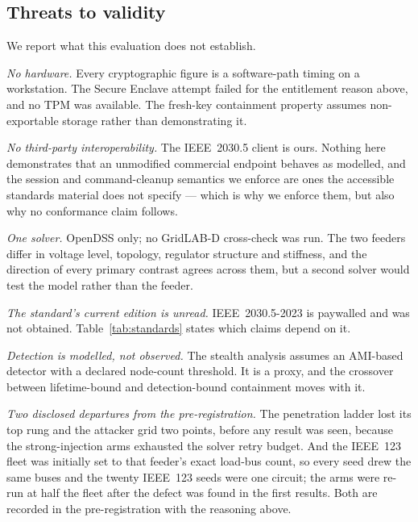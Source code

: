 \subsection{Threats to validity}\label{sec:limits}
We report what this evaluation does not establish.

\emph{No hardware.} Every cryptographic figure is a software-path timing on a workstation. The
Secure Enclave attempt failed for the entitlement reason above, and no TPM was available. The
fresh-key containment property assumes non-exportable storage rather than demonstrating it.

\emph{No third-party interoperability.} The IEEE~2030.5 client is ours. Nothing here demonstrates
that an unmodified commercial endpoint behaves as modelled, and the session and command-cleanup
semantics we enforce are ones the accessible standards material does not specify --- which is why
we enforce them, but also why no conformance claim follows.

\emph{One solver.} OpenDSS only; no GridLAB-D cross-check was run. The two feeders differ in
voltage level, topology, regulator structure and stiffness, and the direction of every primary
contrast agrees across them, but a second solver would test the model rather than the feeder.

\emph{The standard's current edition is unread.} IEEE~2030.5-2023 is paywalled and was not
obtained. Table~\ref{tab:standards} states which claims depend on it.

\emph{Detection is modelled, not observed.} The stealth analysis assumes an AMI-based detector
with a declared node-count threshold. It is a proxy, and the crossover between lifetime-bound and
detection-bound containment moves with it.

\emph{Two disclosed departures from the pre-registration.} The penetration ladder lost its top
rung and the attacker grid two points, before any result was seen, because the strong-injection
arms exhausted the solver retry budget. And the IEEE~123 fleet was initially set to that feeder's
exact load-bus count, so every seed drew the same buses and the twenty IEEE~123 seeds were one
circuit; the arms were re-run at half the fleet after the defect was found in the first results.
Both are recorded in the pre-registration with the reasoning above.
